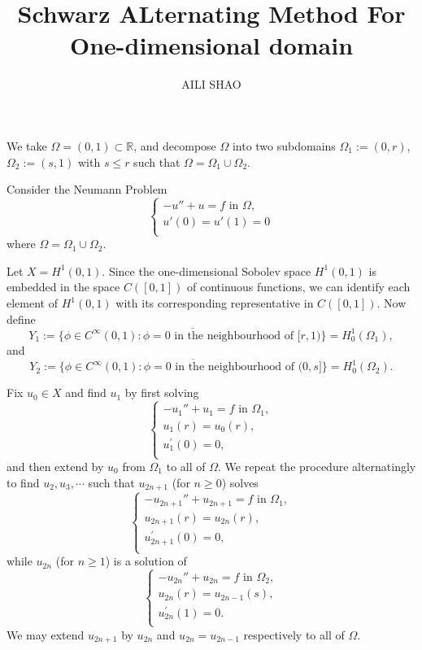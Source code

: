 \documentclass[11pt, a4paper]{amsart}
\begin{document}
\title{Schwarz ALternating Method For One-dimensional domain}
\author{AILI SHAO}
\maketitle
\hrulefill
\hrulefill
\hrulefill

We take $\Omega=(0,1)\subset\mathbb{R}$, and decompose $\Omega$ into two subdomains $\Omega_1:=(0,r)$, $\Omega_2:=(s,1)$ with $s\leq r$ such that $\Omega=\Omega_1\cup\Omega_2$.

Consider the Neumann Problem
$$\begin{cases}
-u''+u=f  \mbox{ in } \Omega, \\
u'(0)=u'(1)=0\\
\end{cases}$$
where $\Omega=\Omega_1\cup\Omega_2$.

Let $X=H^{1}(0,1)$. Since the one-dimensional Sobolev space $H^{1}(0,1)$ is embedded in the space $C([0,1])$ of continuous functions, we can identify each element of $H^{1}(0,1)$ with its corresponding representative in $C([0,1])$. Now define 
$$Y_1:=\overline{\{\phi\in C^{\infty}(0,1):\phi=0 \mbox{ in the neighbourhood of } [r,1)\}}=H_{0}^{1}(\Omega_1),$$ and
$$Y_2:=\overline{\{\phi\in C^{\infty}(0,1):\phi=0 \mbox{ in the neighbourhood of } (0,s]\}}=H_{0}^{1}(\Omega_2).$$

Fix $u_0\in X$ and find $u_1$ by first solving
$$\begin{cases}
-u_1''+u_1=f  \mbox{ in } \Omega_1, \\
u_1(r)=u_0(r),\\
u_1^{\prime}(0)=0,\\
\end{cases}$$ 
and then extend by $u_0$ from $\Omega_1$ to all of $\Omega$.
We repeat the procedure alternatingly to find $u_2,u_3,\cdots$ such that $u_{2n+1}$ (for $n\geq 0$) solves
$$\begin{cases}
-u_{2n+1}''+u_{2n+1}=f  \mbox{ in } \Omega_1, \\
u_{2n+1}(r)=u_{2n}(r),\\
u_{2n+1}^{\prime}(0)=0,\\
\end{cases}$$ 
while $u_{2n}$ (for $n\geq 1$) is a solution of 
$$\begin{cases}
-u_{2n}''+u_{2n}=f  \mbox{ in } \Omega_2, \\
u_{2n}(r)=u_{2n-1}(s),\\
u_{2n}^{\prime}(1)=0.\\
\end{cases}$$  
We may extend $u_{2n+1}$ by $u_{2n}$ and $u_{2n}=u_{2n-1}$ respectively to all of $\Omega$.
\end{document}
